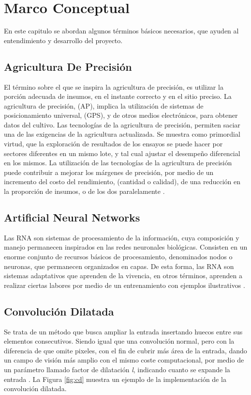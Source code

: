 \chapter{Marco Conceptual}
En este capitulo se abordan algunos términos básicos necesarios, que ayuden al entendimiento y desarrollo del proyecto. 

\section{Agricultura De Precisión} El término sobre el que se inspira la agricultura de precisión, es utilizar la porción adecuada de insumos, en el instante correcto y en el sitio preciso. La agricultura de precisión, (AP), implica la utilización de sistemas de posicionamiento universal, (GPS), y de otros medios electrónicos, para obtener datos del cultivo. Las tecnologías de la agricultura de precisión, permiten saciar una de las exigencias de la agricultura actualizada. Se muestra como primordial virtud, que la exploración de resultados de los ensayos se puede hacer por sectores diferentes en un mismo lote, y tal cual ajustar el desempeño diferencial en los mismos. La utilización de las tecnologías de la agricultura de precisión puede contribuir a mejorar los márgenes de precisión, por medio de un incremento del costo del rendimiento, (cantidad o calidad), de una reducción en la proporción de insumos, o de los dos paralelamente \cite{ref_10}.

\section{Artificial Neural Networks} Las RNA son sistemas de procesamiento de la información, cuya composición y manejo permanecen inspirados en las redes neuronales biológicas. Consisten en un enorme conjunto de recursos básicos de procesamiento, denominados nodos o neuronas, que permanecen organizados en capas. De esta forma, las RNA son sistemas adaptativos que aprenden de la vivencia, en otros términos, aprenden a realizar ciertas labores por medio de un entrenamiento con ejemplos ilustrativos \cite{ref_11}.
\\ 

\section{Convolución Dilatada}

Se trata de un método que busca ampliar la entrada insertando huecos entre sus elementos consecutivos. Siendo igual que una convolución normal, pero con la diferencia de que omite pixeles, con el fin de cubrir más área de la entrada, dando un campo de visión más amplio con el mismo coste computacional, por medio de un parámetro llamado factor de dilatación \textit{l}, indicando cuanto se expande la entrada \cite{wu2019fastfcn}. La Figura \ref{fig:cd} muestra un ejemplo de la implementación de la convolución dilatada.

